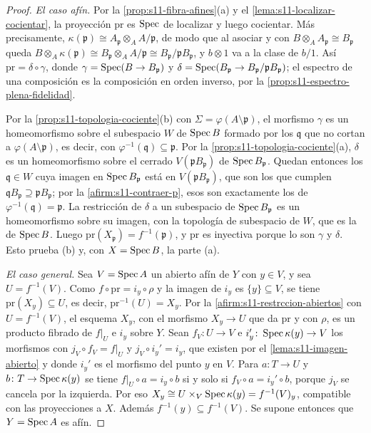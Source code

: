 \begin{proof}
\emph{El caso afín.} Por la \cref{prop:s11-fibra-afines}(a) y el \cref{lema:s11-localizar-cocientar}, la proyección \(\mathrm{pr}\) es \(\operatorname{Spec}\) de localizar y luego cocientar. Más precisamente, \(\kappa(\mathfrak p)\cong A_{\mathfrak p}\otimes_A A/\mathfrak p\), de modo que al asociar y con \(B\otimes_AA_{\mathfrak p}\cong B_{\mathfrak p}\) queda \(B\otimes_A\kappa(\mathfrak p)\cong B_{\mathfrak p}\otimes_AA/\mathfrak p\cong B_{\mathfrak p}/\mathfrak pB_{\mathfrak p}\), y \(b\otimes1\) va a la clase de \(b/1\). Así \(\mathrm{pr}=\delta\circ\gamma\), donde \(\gamma=\operatorname{Spec}(B\to B_{\mathfrak p})\) y \(\delta=\operatorname{Spec}(B_{\mathfrak p}\to B_{\mathfrak p}/\mathfrak pB_{\mathfrak p})\); el espectro de una composición es la composición en orden inverso, por la \cref{prop:s11-espectro-plena-fidelidad}.

Por la \cref{prop:s11-topologia-cociente}(b) con \(\Sigma=\varphi(A\setminus\mathfrak p)\), el morfismo \(\gamma\) es un homeomorfismo sobre el subespacio \(W\) de \(\operatorname{Spec} B\) formado por los \(\mathfrak q\) que no cortan a \(\varphi(A\setminus\mathfrak p)\), es decir, con \(\varphi^{-1}(\mathfrak q)\subseteq\mathfrak p\). Por la \cref{prop:s11-topologia-cociente}(a), \(\delta\) es un homeomorfismo sobre el cerrado \(V(\mathfrak pB_{\mathfrak p})\) de \(\operatorname{Spec} B_{\mathfrak p}\). Quedan entonces los \(\mathfrak q\in W\) cuya imagen en \(\operatorname{Spec} B_{\mathfrak p}\) está en \(V(\mathfrak pB_{\mathfrak p})\), que son los que cumplen \(\mathfrak qB_{\mathfrak p}\supseteq\mathfrak pB_{\mathfrak p}\); por la \cref{afirm:s11-contraer-p}, esos son exactamente los de \(\varphi^{-1}(\mathfrak q)=\mathfrak p\). La restricción de \(\delta\) a un subespacio de \(\operatorname{Spec} B_{\mathfrak p}\) es un homeomorfismo sobre su imagen, con la topología de subespacio de \(W\), que es la de \(\operatorname{Spec} B\). Luego \(\mathrm{pr}(X_{\mathfrak p})=f^{-1}(\mathfrak p)\), y \(\mathrm{pr}\) es inyectiva porque lo son \(\gamma\) y \(\delta\). Esto prueba (b) y, con \(X=\operatorname{Spec} B\), la parte (a).

\emph{El caso general.} Sea \(V=\operatorname{Spec} A\) un abierto afín de \(Y\) con \(y\in V\), y sea \(U=f^{-1}(V)\). Como \(f\circ\mathrm{pr}=i_y\circ\rho\) y la imagen de \(i_y\) es \(\{y\}\subseteq V\), se tiene \(\mathrm{pr}(X_y)\subseteq U\), es decir, \(\mathrm{pr}^{-1}(U)=X_y\). Por la \cref{afirm:s11-restrccion-abiertos} con \(U=f^{-1}(V)\), el esquema \(X_y\), con el morfismo \(X_y\to U\) que da \(\mathrm{pr}\) y con \(\rho\), es un producto fibrado de \(f|_U\) e \(i_y\) sobre \(Y\). Sean \(f_V\colon U\to V\) e \(i_y'\colon\operatorname{Spec}\kappa(y)\to V\) los morfismos con \(j_V\circ f_V=f|_U\) y \(j_V\circ i_y'=i_y\), que existen por el \cref{lema:s11-imagen-abierto} y donde \(i_y'\) es el morfismo del punto \(y\) en \(V\). Para \(a\colon T\to U\) y \(b\colon T\to\operatorname{Spec}\kappa(y)\) se tiene \(f|_U\circ a=i_y\circ b\) si y solo si \(f_V\circ a=i_y'\circ b\), porque \(j_V\) se cancela por la izquierda. Por eso \(X_y\cong U\times_V\operatorname{Spec}\kappa(y)=f^{-1}(V)_y\), compatible con las proyecciones a \(X\). Además \(f^{-1}(y)\subseteq f^{-1}(V)\). Se supone entonces que \(Y=\operatorname{Spec} A\) es afín.


\end{proof}
